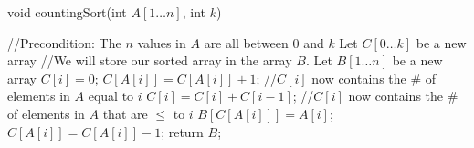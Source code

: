 \documentclass[12pt]{elsart}
\begin{document}
\begin{algorithm}
\caption{void countingSort(int $A[1\ldots n]$, int $k$)}
 \begin{algorithmic}[1]
 \State //Precondition: The $n$ values in $A$ are all between $0$ and $k$
 \State Let $C[0\ldots k]$ be a new array
 \State //We will store our sorted array in the array $B$.
 \State Let $B[1\ldots n]$ be a new array 
        \State $C[i]=0$;
  \EndFor
{}
        \State $C[A[i]]=C[A[i]]+1$;
  \EndFor
\State //$C[i]$ now contains the \# of elements in $A$ equal to $i$
        \State $C[i]=C[i]+C[i-1]$;
  \EndFor
\State //$C[i]$ now contains the \# of elements in $A$ that are $\leq$ to $i$
        \State $B[C[A[i]]]=A[i]$;
        \State $C[A[i]]=C[A[i]]-1$;
  \EndFor
\State return $B$;
\end{algorithmic}
\end{algorithm}
\end{document}
